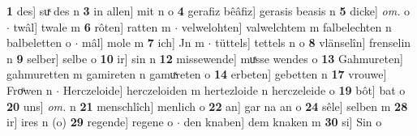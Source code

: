 \documentclass[8pt,a4paper,notitlepage]{article}
\begin{document}
\begin{table}[ht]
\begin{minipage}[t]{0.5\linewidth}
\textbf{1} des] suͯ des n \textbf{3} in allen] mit n o \textbf{4} gerafiz bêâfiz] gerasis beasis n \textbf{5} dicke] \textit{om.} o  $\cdot$ twâl] twale m \textbf{6} rôten] ratten m  $\cdot$ velwelohten] valwelchtem m falbelechten n balbeletten o  $\cdot$ mâl] mole m \textbf{7} ich] Jn m  $\cdot$ tüttels] tettels n o \textbf{8} vlänselîn] frenselin n \textbf{9} selber] selbe o \textbf{10} ir] sin n \textbf{12} missewende] muͯsse wendes o \textbf{13} Gahmureten] gahmuretten m gamireten n gamuͯreten o \textbf{14} erbeten] gebetten n \textbf{17} vrouwe] Froͧwen n  $\cdot$ Herczeloide] herczeloiden m hertezloide n herczeleide o \textbf{19} bôt] bat o \textbf{20} uns] \textit{om.} n \textbf{21} menschlîch] menlich o \textbf{22} an] gar na an o \textbf{24} sêle] selben m \textbf{28} ir] ires n (o) \textbf{29} regende] regene o  $\cdot$ den knaben] dem knaken m \textbf{30} si] Sin o \newline
\end{minipage}
\end{table}
\newpage
\end{document}
